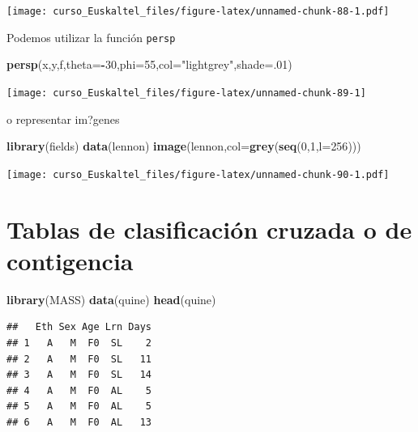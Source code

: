 \documentclass[]{book}
\newenvironment{Shaded}{\begin{snugshade}}{\end{snugshade}}
\newcommand{\KeywordTok}[1]{\textcolor[rgb]{0.13,0.29,0.53}{\textbf{#1}}}
\newcommand{\DataTypeTok}[1]{\textcolor[rgb]{0.13,0.29,0.53}{#1}}
\newcommand{\DecValTok}[1]{\textcolor[rgb]{0.00,0.00,0.81}{#1}}
\newcommand{\StringTok}[1]{\textcolor[rgb]{0.31,0.60,0.02}{#1}}
\newcommand{\OperatorTok}[1]{\textcolor[rgb]{0.81,0.36,0.00}{\textbf{#1}}}
\newcommand{\NormalTok}[1]{#1}
\begin{document}
\texttt{[image: curso\_Euskaltel\_files/figure-latex/unnamed-chunk-88-1.pdf]}

Podemos utilizar la función \texttt{persp}

\begin{Shaded}
\begin{Highlighting}[]
\KeywordTok{persp}\NormalTok{(x,y,f,}\DataTypeTok{theta=}\OperatorTok{-}\DecValTok{30}\NormalTok{,}\DataTypeTok{phi=}\DecValTok{55}\NormalTok{,}\DataTypeTok{col=}\StringTok{"lightgrey"}\NormalTok{,}\DataTypeTok{shade=}\NormalTok{.}\DecValTok{01}\NormalTok{)}
\end{Highlighting}
\end{Shaded}

\begin{center}\texttt{[image: curso\_Euskaltel\_files/figure-latex/unnamed-chunk-89-1]} \end{center}

o representar im?genes

\begin{Shaded}
\begin{Highlighting}[]
\KeywordTok{library}\NormalTok{(fields)}
\KeywordTok{data}\NormalTok{(lennon)}
\KeywordTok{image}\NormalTok{(lennon,}\DataTypeTok{col=}\KeywordTok{grey}\NormalTok{(}\KeywordTok{seq}\NormalTok{(}\DecValTok{0}\NormalTok{,}\DecValTok{1}\NormalTok{,}\DataTypeTok{l=}\DecValTok{256}\NormalTok{)))}
\end{Highlighting}
\end{Shaded}

\texttt{[image: curso\_Euskaltel\_files/figure-latex/unnamed-chunk-90-1.pdf]}

\section{Tablas de clasificación cruzada o de
contigencia}\label{tablas-de-clasificacion-cruzada-o-de-contigencia}

\begin{Shaded}
\begin{Highlighting}[]
\KeywordTok{library}\NormalTok{(MASS)}
\KeywordTok{data}\NormalTok{(quine)}
\KeywordTok{head}\NormalTok{(quine)}
\end{Highlighting}
\end{Shaded}

\begin{verbatim}
##   Eth Sex Age Lrn Days
## 1   A   M  F0  SL    2
## 2   A   M  F0  SL   11
## 3   A   M  F0  SL   14
## 4   A   M  F0  AL    5
## 5   A   M  F0  AL    5
## 6   A   M  F0  AL   13
\end{verbatim}
\end{document}
